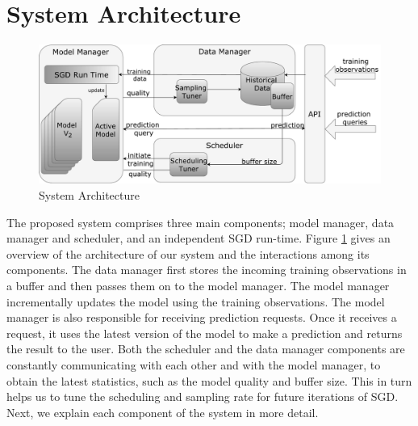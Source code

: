 \documentclass{vldb}
\begin{document}
\section{System Architecture} \label{sec:system-architecutre}
\begin{figure}[t]
\centering
\includegraphics[width=\columnwidth]{../images/system-architecture-final.pdf}
\caption{System Architecture}
\label{fig:system-architecture}
\end{figure}

The proposed system comprises three main components; model manager, data manager and scheduler, and an independent SGD run-time. 
Figure \ref{fig:system-architecture} gives an overview of the architecture of our system and the interactions among its components.
The data manager first stores the incoming training observations in a buffer and then passes them on to the model manager.
The model manager incrementally updates the model using the training observations.
The model manager is also responsible for receiving prediction requests.
Once it receives a request, it uses the latest version of the model to make a prediction and returns the result to the user.
Both the scheduler and the data manager components are constantly communicating with each other and with the model manager, to obtain the latest statistics, such as the model quality and buffer size.
This in turn helps us to tune the scheduling and sampling rate for future iterations of SGD. 
Next, we explain each component of the system in more detail.
\end{document}
